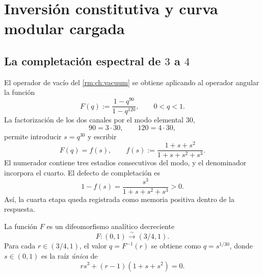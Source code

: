 \chapter{Inversi\'on constitutiva y curva modular cargada}
\label{rm:chap:curva-modular-reconstruccion}

\section{La completación espectral de \(3\) a \(4\)}

El operador de vac\'io del \cref{rm:ch:vacuum} se obtiene aplicando al operador
angular la funci\'on
\begin{equation}
 F(q):=\frac{1-q^{90}}{1-q^{120}},
 \qquad 0<q<1.
 \label{rm:eq:curve-Fq}
\end{equation}
La factorizaci\'on de los dos canales por el modo elemental \(30\),
\begin{equation}
 90=3\cdot30,
 \qquad
 120=4\cdot30,
 \label{rm:eq:curve-90-120}
\end{equation}
permite introducir \(s=q^{30}\) y escribir
\begin{equation}
 F(q)=f(s),
 \qquad
 f(s):=\frac{1+s+s^2}{1+s+s^2+s^3}.
 \label{rm:eq:curve-fs}
\end{equation}
El numerador contiene tres estadios consecutivos del modo, y el denominador
incorpora el cuarto. El defecto de completaci\'on es
\begin{equation}
 1-f(s)=\frac{s^3}{1+s+s^2+s^3}>0.
 \label{rm:eq:curve-completion-defect}
\end{equation}
As\'i, la cuarta etapa queda registrada como memoria positiva dentro de la
respuesta.

\begin{theorem}
\label{rm:thm:curve-F-bijection}
La funci\'on \(F\) es un difeomorfismo anal\'itico decreciente
\begin{equation}
 \boxed{F:(0,1)\xrightarrow{\;\sim\;}(3/4,1).}
 \label{rm:eq:curve-F-range}
\end{equation}
Para cada \(r\in(3/4,1)\), el valor \(q=F^{-1}(r)\) se obtiene como
\(q=s^{1/30}\), donde \(s\in(0,1)\) es la ra\'iz \emph{\'unica} de
\begin{equation}
 r s^3+(r-1)(1+s+s^2)=0.
 \label{rm:eq:curve-inverse-cubic}
\end{equation}
\end{theorem}


